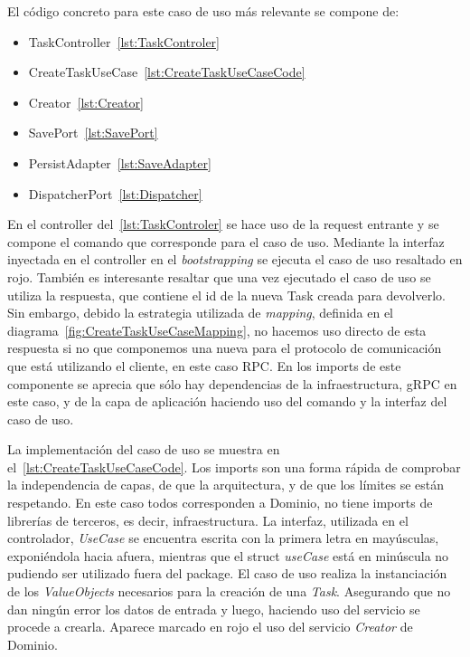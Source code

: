 El código concreto para este caso de uso más relevante se compone de:
\begin{itemize}
    \item TaskController~\cref{lst:TaskControler}
    \item CreateTaskUseCase~\cref{lst:CreateTaskUseCaseCode}
    \item Creator~\cref{lst:Creator}
    \item SavePort~\cref{lst:SavePort}
    \item PersistAdapter~\cref{lst:SaveAdapter}
    \item DispatcherPort~\cref{lst:Dispatcher}
\end{itemize}

En el controller del~\cref{lst:TaskControler} se hace uso de la request entrante y se compone el comando que corresponde para el caso de uso.
Mediante la interfaz inyectada en el controller en el \textit{bootstrapping} se ejecuta el caso de uso resaltado en rojo.
También es interesante resaltar que una vez ejecutado el caso de uso se utiliza la respuesta, que contiene el id de la nueva Task creada para devolverlo.
Sin embargo, debido la estrategia utilizada de \textit{mapping}, definida en el diagrama~\cref{fig:CreateTaskUseCaseMapping}, no hacemos uso directo de esta respuesta si no que componemos una nueva para el protocolo de comunicación que está utilizando el cliente, en este caso RPC.
En los imports de este componente se aprecia que sólo hay dependencias de la infraestructura, gRPC en este caso, y de la capa de aplicación haciendo uso del comando y la interfaz del caso de uso.

La implementación del caso de uso se muestra en el~\cref{lst:CreateTaskUseCaseCode}.
Los imports son una forma rápida de comprobar la independencia de capas, de que la arquitectura, y de que los límites se están respetando.
En este caso todos corresponden a Dominio, no tiene imports de librerías de terceros, es decir, infraestructura.
La interfaz, utilizada en el controlador, \textit{UseCase} se encuentra escrita con la primera letra en mayúsculas, exponiéndola hacia afuera, mientras que el struct \textit{useCase} está en minúscula no pudiendo ser utilizado fuera del package.
El caso de uso realiza la instanciación de los \textit{ValueObjects} necesarios para la creación de una \textit{Task}.
Asegurando que no dan ningún error los datos de entrada y luego, haciendo uso del servicio se procede a crearla.
Aparece marcado en rojo el uso del servicio \textit{Creator} de Dominio.

